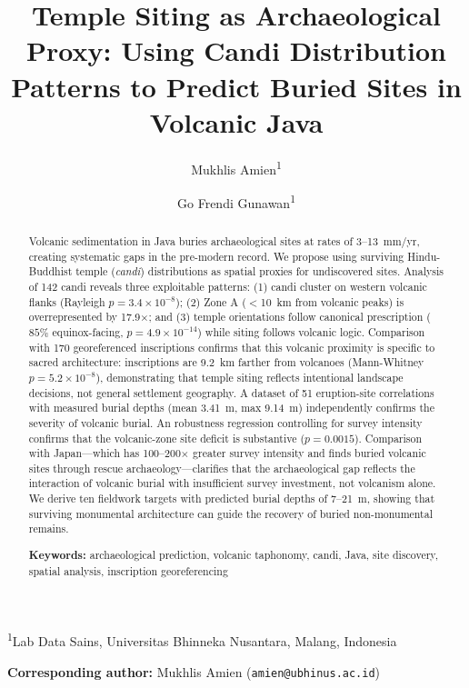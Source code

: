 \documentclass[12pt,a4paper]{article}
\title{Temple Siting as Archaeological Proxy: Using Candi Distribution Patterns to Predict Buried Sites in Volcanic Java}
\author{Mukhlis Amien\textsuperscript{1} \and Go Frendi Gunawan\textsuperscript{1}}
\date{}
\begin{document}
\maketitle

\noindent\textsuperscript{1}Lab Data Sains, Universitas Bhinneka Nusantara, Malang, Indonesia

\vspace{1em}
\noindent\textbf{Corresponding author:} Mukhlis Amien (\texttt{amien@ubhinus.ac.id})

\begin{abstract}
Volcanic sedimentation in Java buries archaeological sites at rates of 3--13~mm/yr, creating systematic gaps in the pre-modern record. We propose using surviving Hindu-Buddhist temple (\emph{candi}) distributions as spatial proxies for undiscovered sites. Analysis of 142 candi reveals three exploitable patterns: (1) candi cluster on western volcanic flanks (Rayleigh $p=3.4\times10^{-8}$); (2) Zone A ($<$10~km from volcanic peaks) is overrepresented by 17.9$\times$; and (3) temple orientations follow canonical prescription ($85\%$ equinox-facing, $p=4.9\times10^{-14}$) while siting follows volcanic logic. Comparison with 170 georeferenced inscriptions confirms that this volcanic proximity is specific to sacred architecture: inscriptions are 9.2~km farther from volcanoes (Mann-Whitney $p=5.2\times10^{-8}$), demonstrating that temple siting reflects intentional landscape decisions, not general settlement geography. A dataset of 51 eruption-site correlations with measured burial depths (mean 3.41~m, max 9.14~m) independently confirms the severity of volcanic burial. An robustness regression controlling for survey intensity confirms that the volcanic-zone site deficit is substantive ($p=0.0015$). Comparison with Japan---which has 100--200$\times$ greater survey intensity and finds buried volcanic sites through rescue archaeology---clarifies that the archaeological gap reflects the interaction of volcanic burial with insufficient survey investment, not volcanism alone. We derive ten fieldwork targets with predicted burial depths of 7--21~m, showing that surviving monumental architecture can guide the recovery of buried non-monumental remains.

\vspace{0.5em}
\noindent\textbf{Keywords:} archaeological prediction, volcanic taphonomy, candi, Java, site discovery, spatial analysis, inscription georeferencing
\end{abstract}

\newpage
\end{document}
